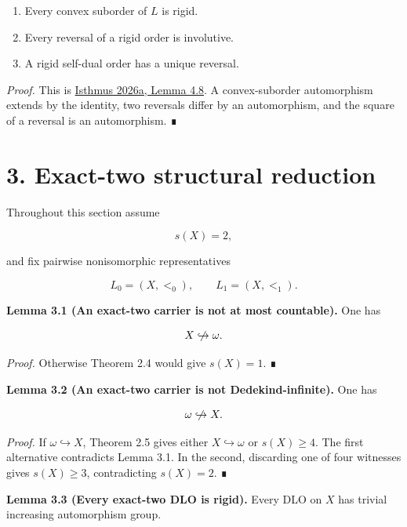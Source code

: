 \documentclass[
  english,
  11pt,
  reqno]{amsart}
\providecommand{\tightlist}{%
  \setlength{\itemsep}{0pt}\setlength{\parskip}{0pt}}
\providecommand{\nhookrightarrow}{\centernot\hookrightarrow}
\begin{document}
\begin{enumerate}
\tightlist
\item
  Every convex suborder of \(L\) is rigid.
\item
  Every reversal of a rigid order is involutive.
\item
  A rigid self-dual order has a unique reversal.
\end{enumerate}

\emph{Proof.} This is \hyperref[ref:isthmus2026a]{Isthmus 2026a, Lemma
4.8}. A convex-suborder automorphism extends by the identity, two
reversals differ by an automorphism, and the square of a reversal is an
automorphism. ∎

\protect{}\label{sec:structural-reduction}

\section{3. Exact-two structural
reduction}\label{exact-two-structural-reduction}

Throughout this section assume

\[
s(X)=2,
\]

and fix pairwise nonisomorphic representatives

\[
L_0=(X,<_{0}),
\qquad
L_1=(X,<_{1}).
\]

\protect{}\label{lem:3-1-not-subcountable}

\textbf{Lemma 3.1 (An exact-two carrier is not at most countable).} One
has

\[
X\nhookrightarrow\omega.
\]

\emph{Proof.} Otherwise Theorem 2.4 would give \(s(X)=1\). ∎

\protect{}\label{lem:3-2-not-dedekind-infinite}

\textbf{Lemma 3.2 (An exact-two carrier is not Dedekind-infinite).} One
has

\[
\omega\nhookrightarrow X.
\]

\emph{Proof.} If \(\omega\hookrightarrow X\), Theorem 2.5 gives either
\(X\hookrightarrow\omega\) or \(s(X)\ge4\). The first alternative
contradicts Lemma 3.1. In the second, discarding one of four witnesses
gives \(s(X)\ge3\), contradicting \(s(X)=2\). ∎

\protect{}\label{lem:3-3-rigidity}

\textbf{Lemma 3.3 (Every exact-two DLO is rigid).} Every DLO on \(X\)
has trivial increasing automorphism group.
\end{document}
